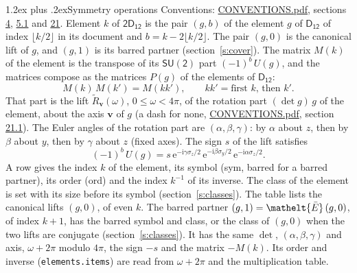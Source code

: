 \documentclass[10pt,a4paper]{article}
\makeatletter
\renewcommand\section{\@startsection{section}{1}{\z@}{-3ex plus -1ex minus -.2ex}%
  {1.2ex plus .2ex}{\normalfont\large\sffamily\bfseries\color{parttitle}}}
\numberwithin{equation}{section}
\newcommand{\eltfont}[1]{{\let\sigma\eltsigma\mathelt{#1}}}
\newcommand{\grp}[1]{\mathsf{#1}}
\newcommand{\elt}[1]{\eltfont{#1}}
\newcommand{\vv}{\mathbf{v}}
\newcommand{\iunit}{\mathrm{i}}
\newcommand{\expe}{\mathrm{e}}
\newcommand{\barred}[1]{\bar{#1}}
\newcommand{\lift}[1]{\tilde{#1}}
\newcommand{\pauli}[1]{\sigma_{#1}}
\makeatother
\begin{document}
\section{Symmetry operations}\label{s:elements}
Conventions: \href{../../CONVENTIONS.pdf}{CONVENTIONS.pdf}, sections \href{../../../rotation/CONVENTIONS.pdf\#conv.4}{4}, \href{../../../rotation/CONVENTIONS.pdf\#conv.5.1}{5.1} and \href{../../CONVENTIONS.pdf\#conv.21}{21}.
\leavevmode\label{n:index.element}\label{n:element.g}Element $k$ of $\grp{2D_{12}}$ is the pair $(g, b)$ of the element $g$ of \href{../../../rotation/data/pdf/D12.pdf}{$\grp{D_{12}}$} of index $\lfloor k/2\rfloor$ in its document and $b = k - 2\lfloor k/2\rfloor$. The pair $(g, 0)$ is the canonical lift of $g$, and $(g, 1)$ is its barred partner (section~\ref{s:cover}). \label{n:matrix.element.pin}\label{n:matrix.element}The matrix $M(k)$ of the element is the transpose of its $\grp{SU(2)}$ part $(-1)^{b}\,U(g)$, and the matrices compose as the matrices $P(g)$ of the elements of $\grp{D_{12}}$:
\begin{equation}\label{e:mprod}M(k)\,M(k') = M(kk'),\qquad kk' = \text{first } k\text{, then } k'.\end{equation}
\leavevmode\label{n:angle.omega}\label{n:vector.axis}\label{n:vector.pole}That part is the lift $\lift{R}_{\vv}(\omega)$, $0 \le \omega < 4\pi$, of the rotation part $(\det g)\,g$ of the element, about the axis $\vv$ of $g$ (a dash for none, \href{../../CONVENTIONS.pdf}{CONVENTIONS.pdf}, section \href{../../CONVENTIONS.pdf\#conv.21.1}{21.1}). \label{n:angle.euler.alpha}\label{n:angle.euler.beta}\label{n:angle.euler.gamma}\label{n:vector.coordinates}The Euler angles of the rotation part are $(\alpha,\beta,\gamma)$: by $\alpha$ about $z$, then by $\beta$ about $y$, then by $\gamma$ about $z$ (fixed axes). \label{n:local.euler.sign}The sign $s$ of the lift satisfies
\begin{equation}\label{e:euler}(-1)^{b}\,U(g) = s\,\expe^{-\iunit\gamma\pauli{z}/2}\,\expe^{-\iunit\beta\pauli{y}/2}\,\expe^{-\iunit\alpha\pauli{z}/2}.\end{equation}
\leavevmode\label{n:index.element.inverse}\label{n:head.sym}\label{n:head.ord}A row gives the index $k$ of the element, its symbol (sym, barred for a barred partner), its order (ord) and the index $k^{-1}$ of its inverse. \label{n:head.class}The class of the element is set with its size before its symbol (section~\ref{s:classes}).
The table lists the canonical lifts $(g, 0)$, of even $k$. The barred partner $(g, 1) = \elt{\barred{E}}\,(g, 0)$, of index $k + 1$, has the barred symbol and class, or the class of $(g, 0)$ when the two lifts are conjugate (section~\ref{s:classes}). It has the same $\det$, $(\alpha,\beta,\gamma)$ and axis, $\omega + 2\pi$ modulo $4\pi$, the sign $-s$ and the matrix $-M(k)$. Its order and inverse (\texttt{elements.items}) are read from $\omega + 2\pi$ and the multiplication table.
\end{document}
